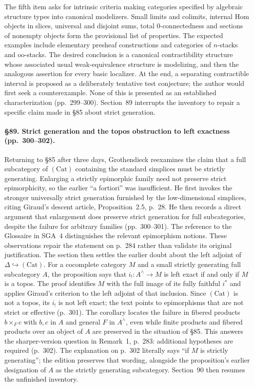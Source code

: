 The fifth item asks for intrinsic criteria making categories specified by algebraic structure types into canonical modelizers. Small limits and colimits, internal Hom objects in slices, universal and disjoint sums, total 0-connectedness and sections of nonempty objects form the provisional list of properties. The expected examples include elementary presheaf constructions and categories of $n$-stacks and $\mathrm{oo}$-stacks. The desired conclusion is a canonical contractibility structure whose associated usual weak-equivalence structure is modelizing, and then the analogous assertion for every basic localizer. At the end, a separating contractible interval is proposed as a deliberately tentative test conjecture; the author would first seek a counterexample. None of this is presented as an established characterization (pp.\ 299--300). Section~89 interrupts the inventory to repair a specific claim made in \S85 about strict generation.




\paragraph{\S89. Strict generation and the topos obstruction to left exactness (pp.\ 300--302).}
Returning to \S85 after three days, Grothendieck reexamines the claim that a full subcategory of $(\mathrm{Cat})$ containing the standard simplices must be strictly generating. Enlarging a strictly epimorphic family need not preserve strict epimorphicity, so the earlier “a fortiori” was insufficient. He first invokes the stronger universally strict generation furnished by the low-dimensional simplices, citing Giraud's descent article, Proposition~2.5, p.\ 28. He then records a direct argument that enlargement does preserve strict generation for full subcategories, despite the failure for arbitrary families (pp.\ 300--301). The reference to the Glossaire in SGA~4 distinguishes the relevant epimorphism notions. These observations repair the statement on p.\ 284 rather than validate its original justification.
The section then settles the earlier doubt about the left adjoint of $\Delta\hookrightarrow(\mathrm{Cat})$. For a cocomplete category $M$ and a small strictly generating full subcategory $A$, the proposition says that $i_!:A^\wedge\to M$ is left exact if and only if $M$ is a topos. The proof identifies $M$ with the full image of its fully faithful $i^*$ and applies Giraud's criterion to the left adjoint of that inclusion. Since $(\mathrm{Cat})$ is not a topos, its $i_!$ is not left exact; the text points to epimorphisms that are not strict or effective (p.\ 301). The corollary locates the failure in fibered products $b\times_F c$ with $b,c$ in $A$ and general $F$ in $A^\wedge$, even while finite products and fibered products over an object of $A$ are preserved in the situation of \S85. This answers the sharper-version question in Remark~1, p.\ 283: additional hypotheses are required (p.\ 302). The explanation on p.\ 302 literally says “if $M$ is strictly generating”; the edition preserves that wording, alongside the proposition's earlier designation of $A$ as the strictly generating subcategory. Section~90 then resumes the unfinished inventory.




